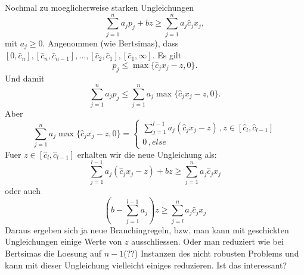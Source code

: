 \documentclass[titlepage, a4paper]{amsbook}
\theoremstyle{plain}
\theoremstyle{break}
\theoremstyle{definition}
\theoremstyle{remark}
\numberwithin{equation}{thm}
\begin{document}
Nochmal zu moeglicherweise starken Ungleichungen
\[\sum_{j=1}^n a_j p_j + bz \geq \sum_{j=1}^n a_j \hat{c}_j x_j,\]
mit $a_j \geq 0$.
Angenommen (wie Bertsimas), dass $[0,\hat{c}_n], [\hat{c}_{n}, \hat{c}_{n-1}], \ldots, [\hat{c}_{2},\hat{c}_{1}], [\hat{c}_{1}, \infty]$. 
Es gilt 
\[p_j \leq \max\{\hat{c}_{j}x_j-z,0\}.\]
Und damit
\[\sum_{j=1}^n a_j p_j \leq \sum_{j=1}^n a_j \max\{\hat{c}_{j}x_j-z,0\}.\]
Aber 
\begin{equation*}
\sum_{j=1}^n a_j \max\{\hat{c}_{j}x_j-z,0\} =    \begin{cases}
    \sum_{j=1}^{l-1}a_j(\hat{c}_{j}x_j-z) \,, z \in [\hat{c}_{l},\hat{c}_{l-1}] \\
    0 \,, else
    \end{cases}
\end{equation*}
Fuer $z \in [\hat{c}_{l},\hat{c}_{l-1}]$
erhalten wir die neue Ungleichung als:
\[\sum_{j=1}^{l-1}a_j(\hat{c}_{j}x_j-z) + bz \geq \sum_{j=1}^n a_j \hat{c}_j x_j\]
oder auch 
\[(b-\sum_{j=1}^{l-1}a_j)z \geq \sum_{j=l}^n a_j \hat{c}_j x_j\]
Daraus ergeben sich ja neue Branchingregeln, bzw. man kann mit geschickten Ungleichungen einige Werte von $z$ ausschliessen.
Oder man reduziert wie bei Bertsimas die Loesung auf $n-1$(??) Instanzen des nicht robusten Problems und kann mit dieser Ungleichung vielleicht einiges reduzieren.
Ist das interessant?
\end{document}
